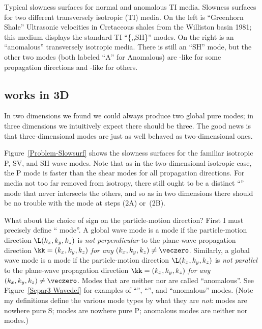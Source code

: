 {Typical slowness surfaces for normal and anomalous TI media.}
{
Slowness surfaces for two different transversely isotropic (TI) media.
On the left is ``Greenhorn Shale''
{Ultrasonic velocities in Cretaceous shales from the Williston basin}
{1981};
this medium displays the standard TI ``\{{\qP},{\qSV},SH\}'' modes.
On the right is an ``anomalous'' transversely isotropic media.
There is still an ``SH'' mode, but the other two modes (both labeled
``A'' for Anomalous) are
{\qP}-like for some propagation directions and {\qSV}-like for others.
}

\subsection{{\qP} works in 3D}
In two dimensions we found we could always produce two global pure modes;
in three dimensions we intuitively expect there should be three.
The good news is that three-dimensional {\qP} modes are just as
well behaved as two-dimensional ones.

Figure~\ref{Problem-Slowsurf} shows the slowness surfaces
for the familiar isotropic P, SV, and SH wave modes.
Note that as in the two-dimensional isotropic case, the P mode is
faster than the shear modes for all propagation directions.
For media not too far removed from isotropy, there
still ought to be a distinct
``{\qP}'' mode that never intersects the others, and
so as in two dimensions there should be no trouble with the
{\qP} mode at steps (2A) or~(2B).

What about the choice of sign on the particle-motion direction?
First I must precisely define ``{\qP} mode''.
A global wave mode is a {\qP} mode if the particle-motion direction
$\L(k_x,k_y,k_z)$ is {\em not perpendicular\/}
to the plane-wave propagation direction
$\kk = (k_x,k_y,k_z)$ {\em for any\/} $(k_x,k_y,k_z) \neq \veczero$.
Similarly,
a global wave mode is a {\qS} mode if the particle-motion direction
$\L(k_x,k_y,k_z)$ is {\em not parallel\/} to the
plane-wave propagation direction
$\kk = (k_x,k_y,k_z)$ {\em for any\/} $(k_x,k_y,k_z) \neq \veczero$.
Modes that are neither {\qP} nor {\qS} are called ``anomalous''.
See Figure~\ref{Separ3-Wavedef} for examples of ``{\qP}'',
``{\qS}'', and ``anomalous'' modes.
(Note my definitions define the various mode types by what they are
{\em not\/}: {\qP} modes are nowhere pure S; {\qS} modes are nowhere pure P;
anomalous modes are neither {\qP} nor {\qS} modes.)

